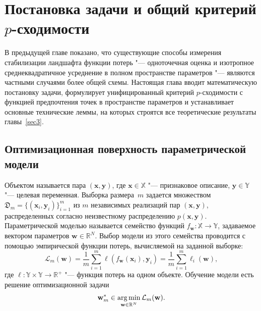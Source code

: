 \section{Постановка задачи и общий критерий $p$-сходимости}\label{sec2}

В предыдущей главе показано, что существующие способы измерения стабилизации ландшафта функции потерь "--- одноточечная оценка и изотропное среднеквадратичное усреднение в полном пространстве параметров "--- являются частными случаями более общей схемы. Настоящая глава вводит математическую постановку задачи, формулирует унифицированный критерий $p$-сходимости с функцией предпочтения точек в пространстве параметров и устанавливает основные технические леммы, на которых строятся все теоретические результаты главы~\ref{sec3}.

\subsection{Оптимизационная поверхность параметрической модели}\label{subsec:loss-landscape}

Объектом называется пара $(\mathbf{x}, \mathbf{y})$, где $\mathbf{x} \in \mathbb{X}$ "--- признаковое описание, $\mathbf{y} \in \mathbb{Y}$ "--- целевая переменная. Выборка размера~$m$ задается множеством $\mathfrak{D}_m = \{(\mathbf{x}_i, \mathbf{y}_i)\}_{i=1}^m$ из $m$ независимых реализаций пар $(\mathbf{x}, \mathbf{y})$, распределенных согласно неизвестному распределению $p(\mathbf{x}, \mathbf{y})$. Параметрической моделью называется семейство функций $f_{\mathbf{w}}: \mathbb{X} \to \mathbb{Y}$, задаваемое вектором параметров $\mathbf{w} \in \mathbb{R}^{N}$. Выбор модели из этого семейства проводится с помощью эмпирической функции потерь, вычисляемой на заданной выборке:
\begin{equation}
    \label{eq:landscape-empirical-loss}
    \mathcal{L}_m(\mathbf{w}) = \frac{1}{m} \sum_{i=1}^m \ell(f_{\mathbf{w}}(\mathbf{x}_i), \mathbf{y}_i) = \frac{1}{m} \sum_{i=1}^m \ell_i(\mathbf{w}),
\end{equation}
где $\ell: \mathbb{Y} \times \mathbb{Y} \to \mathbb{R}^+$ "--- функция потерь на одном объекте. Обучение модели есть решение оптимизационной задачи
\begin{equation}
    \label{eq:landscape-min-problem}
    \mathbf{w}_m^* \in \operatorname*{arg\,min}_{\mathbf{w} \in \mathbb{R}^{N}} \mathcal{L}_m(\mathbf{w}).
\end{equation}

